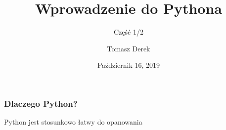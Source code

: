 \documentclass{beamer}
\title{Wprowadzenie do Pythona}
\subtitle{Część 1/2}
\author{Tomasz Derek}
\institute{Koło Matematyki Stosowanej}
\date{Październik 16, 2019}
\begin{document}
 
\frame{\titlepage}
 
\begin{frame}
\frametitle{Dlaczego Python?}
Python jest stosunkowo łatwy do opanowania
\end{frame}
\end{document}
